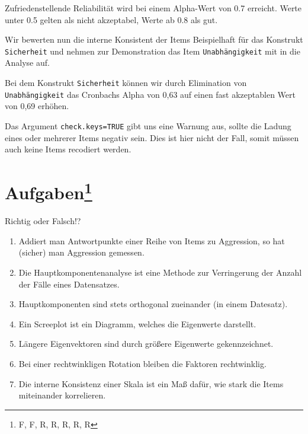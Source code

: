 \documentclass[12pt,ngerman,]{book}
\makeatletter
\newenvironment{Shaded}{\begin{snugshade}}{\end{snugshade}}
\newcommand{\KeywordTok}[1]{\textcolor[rgb]{0.13,0.29,0.53}{\textbf{#1}}}
\newcommand{\DataTypeTok}[1]{\textcolor[rgb]{0.13,0.29,0.53}{#1}}
\newcommand{\StringTok}[1]{\textcolor[rgb]{0.31,0.60,0.02}{#1}}
\newcommand{\OtherTok}[1]{\textcolor[rgb]{0.56,0.35,0.01}{#1}}
\newcommand{\OperatorTok}[1]{\textcolor[rgb]{0.81,0.36,0.00}{\textbf{#1}}}
\newcommand{\NormalTok}[1]{#1}
\let\rmarkdownfootnote\footnote%
\def\footnote{\protect\rmarkdownfootnote}
\newenvironment{kframe}{%
\medskip{}
\setlength{\fboxsep}{.8em}
 \def\at@end@of@kframe{}%
 \ifinner\ifhmode%
  \def\at@end@of@kframe{\end{minipage}}%
  \begin{minipage}{\columnwidth}%
 \fi\fi%
 \def\FrameCommand##1{\hskip\@totalleftmargin \hskip-\fboxsep
 \colorbox{shadecolor}{##1}\hskip-\fboxsep
     \hskip-\linewidth \hskip-\@totalleftmargin \hskip\columnwidth}%
 \MakeFramed {\advance\hsize-\width
   \@totalleftmargin\z@ \linewidth\hsize
   \@setminipage}}%
 {\par\unskip\endMakeFramed%
 \at@end@of@kframe}
\renewenvironment{Shaded}{\begin{kframe}}{\end{kframe}}
\theoremstyle{definition}
\theoremstyle{definition}
\theoremstyle{remark}
\let\BeginKnitrBlock\begin \let\EndKnitrBlock\end
\makeatother
\begin{document}
Zufriedenstellende Reliabilität wird bei einem Alpha-Wert von 0.7
erreicht. Werte unter 0.5 gelten als nicht akzeptabel, Werte ab 0.8 als
gut.

Wir bewerten nun die interne Konsistent der Items Beispielhaft für das
Konstrukt \texttt{Sicherheit} und nehmen zur Demonstration das Item
\texttt{Unabhängigkeit} mit in die Analyse auf.

\begin{Shaded}
\end{Shaded}

Bei dem Konstrukt \texttt{Sicherheit} können wir durch Elimination von
\texttt{Unabhängigkeit} das Cronbachs Alpha von 0,63 auf einen fast
akzeptablen Wert von 0,69 erhöhen.

Das Argument \texttt{check.keys=TRUE} gibt uns eine Warnung aus, sollte
die Ladung eines oder mehrerer Items negativ sein. Dies ist hier nicht
der Fall, somit müssen auch keine Items recodiert werden.

\section[Aufgaben]{\texorpdfstring{Aufgaben\footnote{F, F, R, R, R, R, R}}{Aufgaben}}\label{aufgaben-17}

\BeginKnitrBlock{rmdexercises}
Richtig oder Falsch!?

\begin{enumerate}
\def\labelenumi{\arabic{enumi}.}
\item
  Addiert man Antwortpunkte einer Reihe von Items zu Aggression, so hat
  (sicher) man Aggression gemessen.
\item
  Die Hauptkomponentenanalyse ist eine Methode zur Verringerung der
  Anzahl der Fälle eines Datensatzes.
\item
  Hauptkomponenten sind stets orthogonal zueinander (in einem Datesatz).
\item
  Ein Screeplot ist ein Diagramm, welches die Eigenwerte darstellt.
\item
  Längere Eigenvektoren sind durch größere Eigenwerte gekennzeichnet.
\item
  Bei einer rechtwinkligen Rotation bleiben die Faktoren rechtwinklig.
\item
  Die interne Konsistenz einer Skala ist ein Maß dafür, wie stark die
  Items miteinander korrelieren.
\end{enumerate}
\EndKnitrBlock{rmdexercises}
\end{document}
